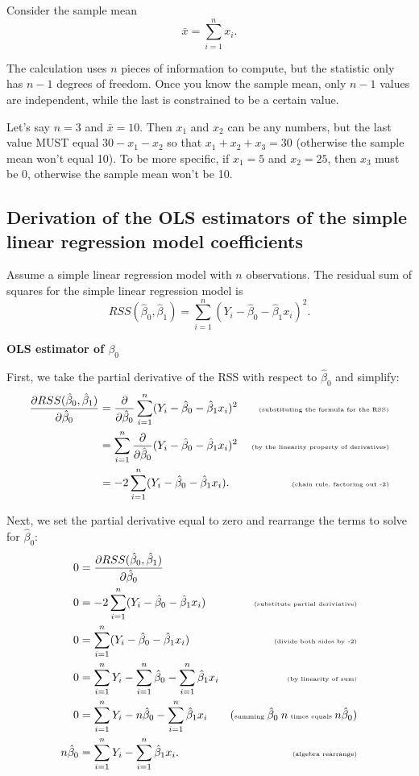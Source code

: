 \documentclass[
]{book}
\theoremstyle{definition}
\theoremstyle{definition}
\theoremstyle{definition}
\theoremstyle{definition}
\theoremstyle{remark}
\begin{document}
Consider the sample mean
\[\bar{x}=\sum_{i=1}^n x_i.\]

The calculation uses \(n\) pieces of information to compute, but the statistic only has \(n-1\) degrees of freedom. Once you know the sample mean, only \(n-1\) values are independent, while the last is constrained to be a certain value.

Let's say \(n=3\) and \(\bar{x} = 10\). Then \(x_1\) and \(x_2\) can be any numbers, but the last value MUST equal \(30 - x_1 - x_2\) so that \(x_1 + x_2 + x_3 = 30\) (otherwise the sample mean won't equal 10). To be more specific, if \(x_1 = 5\) and \(x_2 = 25\), then \(x_3\) must be 0, otherwise the sample mean won't be 10.

\hypertarget{slr-derivation}{%
\subsection{Derivation of the OLS estimators of the simple linear regression model coefficients}\label{slr-derivation}}

Assume a simple linear regression model with \(n\) observations. The residual sum of squares for the simple linear regression model is
\[
RSS(\hat\beta_0, \hat\beta_1) = \sum_{i=1}^n(Y_i - \hat\beta_0 - \hat\beta_1x_i)^2.
\]

\textbf{OLS estimator of \(\beta_0\)}

First, we take the partial derivative of the RSS with respect to \(\hat\beta_0\) and simplify:
\[
\begin{aligned}
\frac{\partial RSS(\hat\beta_0, \hat\beta_1)}{\partial \hat\beta_0} &= \frac{\partial}{\partial \hat\beta_0}\sum_{i=1}^n(Y_i - \hat\beta_0 - \hat\beta_1x_i)^2 & \tiny\text{ (substituting the formula for the RSS)} \\
&= \sum_{i=1}^n \frac{\partial}{\partial \hat\beta_0}(Y_i - \hat\beta_0 - \hat\beta_1x_i)^2  & \tiny\text{ (by the linearity property of derivatives)} \\
&= -2\sum_{i=1}^n(Y_i - \hat\beta_0 - \hat\beta_1x_i). & \tiny\text{ (chain rule, factoring out -2)}
\end{aligned}
\]

Next, we set the partial derivative equal to zero and rearrange the terms to solve for \(\hat{\beta}_0\):
\[
\begin{aligned}
0 &= \frac{\partial RSS(\hat\beta_0, \hat\beta_1)}{\partial \hat\beta_0}  &  \\
0 &= -2\sum_{i=1}^n(Y_i - \hat\beta_0 - \hat\beta_1x_i) & \tiny\text{ (substitute partial deriviative)}\\
0 &= \sum_{i=1}^n(Y_i - \hat\beta_0 - \hat\beta_1x_i) & \tiny\text{ (divide both sides by -2)} \\
0 &= \sum_{i=1}^n Y_i - \sum_{i=1}^n\hat\beta_0 - \sum_{i=1}^n\hat\beta_1x_i &\tiny\text{ (by linearity of sum)} \\
0 &= \sum_{i=1}^n Y_i - n\hat\beta_0 - \sum_{i=1}^n\hat\beta_1x_i & \tiny(\text{summing }\hat\beta_0\ n\text{ times equals }n\hat\beta_0) \\
n\hat\beta_0 &= \sum_{i=1}^n Y_i-\sum_{i=1}^n\hat\beta_1x_i. &\tiny\text{ (algebra rearrange)}
\end{aligned}
\]
\end{document}
